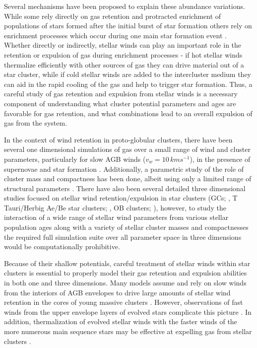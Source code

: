 \documentclass[fleqn,usenatbib]{mnras}
\begin{document}
 Several mechanisms have been proposed to explain these abundance variations.
 While some rely directly on gas retention and protracted enrichment of populations of stars formed after the initial burst of star formation  \citep{prantzos2007,ventura2008a,ventura2008b,pflamm2009,dercole2010,conroy2011a} others rely on enrichment processes which occur during one main star formation event \citep{bastian2013b,deMink2009,den2014,prantzos2006}.
Whether directly or indirectly, stellar winds can play an important role in the retention or expulsion of gas during enrichment processes - if hot stellar winds thermalize efficiently with other sources of gas they can drive material out of a star cluster, while if cold stellar winds are added to the intercluster medium they can aid in the rapid cooling of the gas and help to trigger star formation.
 Thus, a careful study of gas retention and expulsion from stellar winds is a necessary component of understanding what cluster potential parameters and ages are favorable for gas retention, and what combinations lead to an overall expulsion of gas from the system.

 In the context of wind retention in proto-globular clusters, there have been several one dimensional simulations of gas over a small range of wind and cluster parameters, particularly for slow AGB winds  ($v_w = 10 \, km s^{-1}$), in the presence of supernovae and star formation \citep[e.g.][]{dercole2008}.
 Additionally, a parametric study of  the role  of cluster mass and compactness has been done, albeit using only  a  limited range of structural parameters \citep{vesperini2010}.
 There have also been several detailed three dimensional studies focused on stellar wind retention/expulsion in star clusters (GCs; \citealt{calura2015,priestley2011}, T Tauri/Herbig Ae/Be star clusters; \citealt{rg2008}, OB clusters; \citealt{pittard2013}), however, to study the interaction of a wide range of stellar wind parameters from various stellar population ages along with a variety of stellar cluster masses and compactnesses the required full simulation suite over all parameter space in three dimensions would be computationally prohibitive. 


 Because of their shallow potentials, careful treatment of stellar winds within star clusters is essential to properly model their gas retention and expulsion abilities in both one and three dimensions.
 Many models assume and rely on slow winds from the interiors of AGB envelopes to drive large amounts of stellar wind retention in the cores of young massive clusters \citep[e.g.][]{dercole2008}.
 However, observations of fast winds from the upper envelope layers of evolved stars complicate this picture \citep{mauas2006}.
 In addition, thermalization of evolved stellar winds with the faster winds of the more numerous main sequence stars may be effective at expelling gas from stellar clusters \citep{smith1999}.
\end{document}
